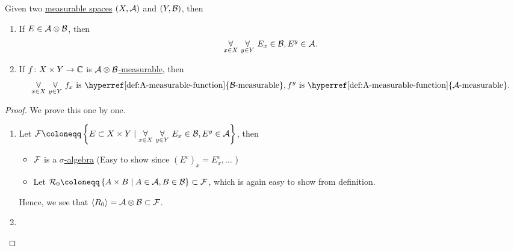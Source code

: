 \begin{proposition}
	Given two \hyperref[def:measurable-space]{measurable spaces} \((X, \mathcal{\MakeUppercase{a}} )\) and \((Y, \mathcal{\MakeUppercase{b}} )\), then
	\begin{enumerate}
		\item If \(E\in \mathcal{\MakeUppercase{a}} \otimes \mathcal{\MakeUppercase{b}}\), then
		      \[
			      \underset{x\in X}{\forall }\ \underset{y\in Y}{\forall }\ E_x\in \mathcal{\MakeUppercase{b}} , E^y\in \mathcal{\MakeUppercase{a}}.
		      \]
		\item If \(f\colon X\times Y\to \mathbb{\MakeUppercase{c}} \) is \hyperref[def:A-measurable-function]{\(\mathcal{\MakeUppercase{a}} \otimes \mathcal{\MakeUppercase{b}} \)-measurable}, then
		      \[
			      \underset{x\in X}{\forall }\ \underset{y\in Y}{\forall }\ f_x \text{ is \hyperref[def:A-measurable-function]{\(\mathcal{\MakeUppercase{b}}\)-measurable}}, f^y \text{ is \hyperref[def:A-measurable-function]{\(\mathcal{\MakeUppercase{a}}\)-measurable}}.
		      \]
	\end{enumerate}
\end{proposition}
\begin{proof}
	We prove this one by one.
	\begin{enumerate}
		\item Let \(\mathcal{\MakeUppercase{f}} \coloneqq \left\{E\subset X\times Y \mid \underset{x\in X}{\forall }\ \underset{y\in Y}{\forall }\ E_x\in \mathcal{\MakeUppercase{b}} , E^y\in \mathcal{\MakeUppercase{a}}\right\}\), then
		      \begin{itemize}
			      \item \(\mathcal{\MakeUppercase{f}} \) is a \hyperref[def:sigma-algebra]{\(\sigma\)-algebra} (Easy to show since \((E^{c} )_x = E_{x}^{c} , \ldots  \) )
			      \item Let \(\mathcal{\MakeUppercase{r}} _0 \coloneqq \left\{A\times B \mid A\in \mathcal{\MakeUppercase{a}} , B\in \mathcal{\MakeUppercase{b}} \right\}\subset \mathcal{\MakeUppercase{f}}\), which is again
			            easy to show from definition.
		      \end{itemize}
		      Hence, we see that \(\left< R_0 \right> = \mathcal{\MakeUppercase{a}} \otimes \mathcal{\MakeUppercase{b}} \subset \mathcal{\MakeUppercase{f}} \).
		\item {}
	\end{enumerate}
\end{proof}

